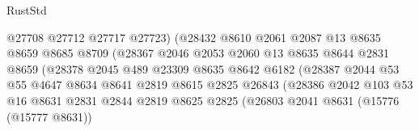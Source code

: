 \begin{lexlean}{RustStd}
\begin{coremodule}
                                      @27708
                                      @27712
                                      @27717
                                      @27723)
                                    (@28432
                                      @8610
                                      @2061
                                      @2087
                                      @13
                                      @8635
                                      @8659
                                      @8685
                                      @8709
                                      (@28367
                                        @2046
                                        @2053
                                        @2060
                                        @13
                                        @8635
                                        @8644
                                        @2831
                                        @8659
                                        (@28378
                                          @2045
                                          @489
                                          @23309
                                          @8635
                                          @8642
                                          @6182
                                          (@28387
                                            @2044
                                            @53
                                            @55
                                            @4647
                                            @8634
                                            @8641
                                            @2819
                                            @8615
                                            @2825
                                            @26843
                                            (@28386
                                              @2042
                                              @103
                                              @53
                                              @16
                                              @8631
                                              @2831
                                              @2844
                                              @2819
                                              @8625
                                              @2825
                                              (@26803
                                                @2041
                                                @8631
                                                (@15776 (@15777 @8631))

\end{coremodule}
\end{lexlean}

